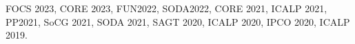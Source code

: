 
FOCS 2023, CORE 2023, FUN2022, SODA2022, CORE 2021, ICALP 2021, PP2021, SoCG 2021, SODA 2021, SAGT 2020, ICALP 2020, IPCO 2020, ICALP 2019.

